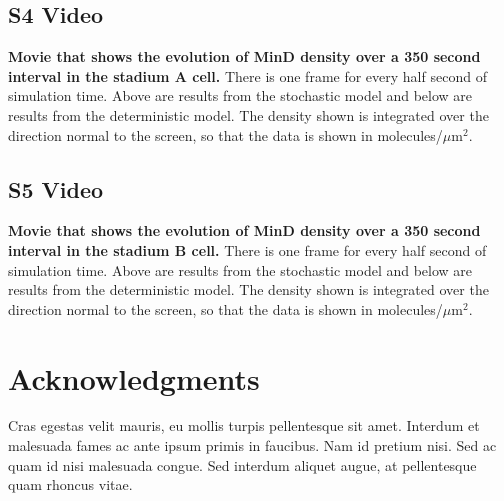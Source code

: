 \documentclass[10pt,letterpaper]{article}
\newcommand\micron{\ensuremath{\mu\text{m}}}
\begin{document}
\subsection*{S4 Video}
\label{movie-MinD-density-stadium-A}
{\bf Movie that shows the evolution of MinD density over a 350 second
  interval in the stadium A cell.}  There is one frame for every half
second of simulation time. Above are results from the stochastic model
and below are results from the deterministic model.  The density shown
is integrated over the direction normal to the screen, so that the
data is shown in molecules/$\micron^2$.

\subsection*{S5 Video}
\label{movie-MinD-density-stadium-B}
{\bf Movie that shows the evolution of MinD density over a 350 second
  interval in the stadium B cell.}  There is one frame for every half
second of simulation time. Above are results from the stochastic model
and below are results from the deterministic model.  The density shown
is integrated over the direction normal to the screen, so that the
data is shown in molecules/$\micron^2$.

\section*{Acknowledgments}
Cras egestas velit mauris, eu mollis turpis pellentesque sit
amet. Interdum et malesuada fames ac ante ipsum primis in
faucibus. Nam id pretium nisi. Sed ac quam id nisi malesuada
congue. Sed interdum aliquet augue, at pellentesque quam rhoncus
vitae.

\nolinenumbers



\end{document}
